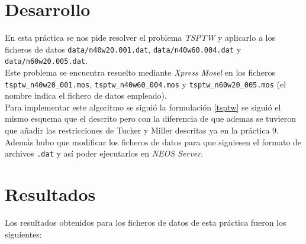 \documentclass[a4paper,11pt]{article}
\begin{document}
\newpage
\section{Desarrollo}
En esta práctica se nos pide resolver el problema \textit{TSPTW} y aplicarlo a los ficheros de datos \texttt{data/n40w20.001.dat}, \texttt{data/n40w60.004.dat} y \texttt{data/n60w20.005.dat}.\\

Este problema se encuentra resuelto mediante \textit{Xpress Mosel} en los ficheros \texttt{tsptw\_n40w20\_001.mos}, \texttt{tsptw\_n40w60\_004.mos} y \texttt{tsptw\_n60w20\_005.mos} (el nombre indica el fichero de datos empleado).\\

Para implementar este algoritmo se siguió la formulación \ref{tsptw} se siguió el mismo esquema que el descrito pero con la diferencia de que ademas se tuvieron que añadir las restricciones de Tucker y Miller descritas ya en la práctica 9. Además hubo que modificar los ficheros de datos para que siguiesen el formato de archivos \texttt{.dat} y así poder ejecutarlos en \textit{NEOS Server}.

\newpage
\section{Resultados}
Los resultados obtenidos para los ficheros de datos de esta práctica fueron los siguientes:
\end{document}
